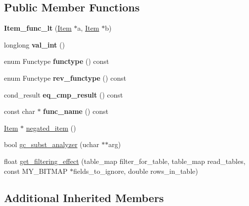 \subsection*{Public Member Functions}
\begin{DoxyCompactItemize}
\item 
\mbox{\label{classItem__func__lt_a28a8dc00a52d091bb52dd5765d65ddb0}} 
{\bfseries Item\+\_\+func\+\_\+lt} (\mbox{\hyperlink{classItem}{Item}} $\ast$a, \mbox{\hyperlink{classItem}{Item}} $\ast$b)
\item 
\mbox{\label{classItem__func__lt_a6e9597a9c0ea94b0198a883aff99e8b6}} 
longlong {\bfseries val\+\_\+int} ()
\item 
\mbox{\label{classItem__func__lt_a449b86e35d906fe537fa8cbc0ec03bf3}} 
enum Functype {\bfseries functype} () const
\item 
\mbox{\label{classItem__func__lt_a370c1159d2d518acb090ee9b3cfecb70}} 
enum Functype {\bfseries rev\+\_\+functype} () const
\item 
\mbox{\label{classItem__func__lt_a27e36e67c9112dac505ca7fdf178459a}} 
cond\+\_\+result {\bfseries eq\+\_\+cmp\+\_\+result} () const
\item 
\mbox{\label{classItem__func__lt_a997005d2e529e8b5c63b5c60f80c5c60}} 
const char $\ast$ {\bfseries func\+\_\+name} () const
\item 
\mbox{\hyperlink{classItem}{Item}} $\ast$ \mbox{\hyperlink{classItem__func__lt_a79050db0ccd1153a0550dc3f41753f19}{negated\+\_\+item}} ()
\item 
bool \mbox{\hyperlink{classItem__func__lt_aa224df880d91b7ece8f36854f3d2db5d}{gc\+\_\+subst\+\_\+analyzer}} (uchar $\ast$$\ast$arg)
\item 
float \mbox{\hyperlink{classItem__func__lt_a433d163fb3b3c78d1af1695f558da117}{get\+\_\+filtering\+\_\+effect}} (table\+\_\+map filter\+\_\+for\+\_\+table, table\+\_\+map read\+\_\+tables, const M\+Y\+\_\+\+B\+I\+T\+M\+AP $\ast$fields\+\_\+to\+\_\+ignore, double rows\+\_\+in\+\_\+table)
\end{DoxyCompactItemize}
\subsection*{Additional Inherited Members}


